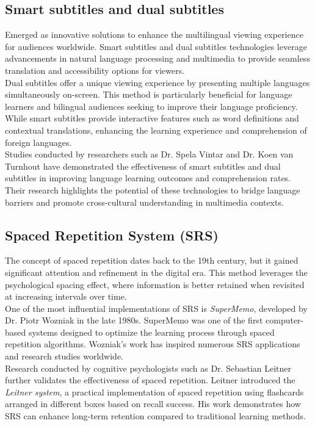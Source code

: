 \documentclass[12pt]{article}
\begin{document}
\subsection{Smart subtitles and dual subtitles }
 Emerged as innovative solutions to enhance the multilingual viewing experience for audiences worldwide. Smart subtitles and dual subtitles technologies leverage advancements in natural language processing and multimedia to provide seamless translation and accessibility options for viewers. \\
Dual subtitles offer a unique viewing experience by presenting multiple languages simultaneously on-screen. This method is particularly beneficial for language learners and bilingual audiences seeking to improve their language proficiency. While smart subtitles provide interactive features such as word definitions and contextual translations, enhancing the learning experience and comprehension of foreign languages. \\
Studies conducted by researchers such as Dr. Spela Vintar and Dr. Koen van Turnhout have demonstrated the effectiveness of smart subtitles and dual subtitles in improving language learning outcomes and comprehension rates. Their research highlights the potential of these technologies to bridge language barriers and promote cross-cultural understanding in multimedia contexts.\\

\subsection{Spaced Repetition System (SRS)}
The concept of spaced repetition dates back to the 19th century, but it gained significant attention and refinement in the digital era. This method leverages the psychological spacing effect, where information is better retained when revisited at increasing intervals over time. \\
One of the most influential implementations of SRS is \textit{SuperMemo}, developed by Dr. Piotr Wozniak in the late 1980s. SuperMemo was one of the first computer-based systems designed to optimize the learning process through spaced repetition algorithms. Wozniak's work has inspired numerous SRS applications and research studies worldwide.\\
Research conducted by cognitive psychologists such as Dr. Sebastian Leitner further validates the effectiveness of spaced repetition. Leitner introduced the \textit{Leitner system}, a practical implementation of spaced repetition using flashcards arranged in different boxes based on recall success. His work demonstrates how SRS can enhance long-term retention compared to traditional learning methods.\\
\end{document}
